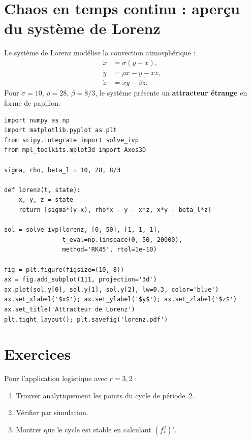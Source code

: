 \section{Chaos en temps continu : aper\c{c}u du syst\`eme de Lorenz}

\begin{definition}
Le syst\`eme de Lorenz mod\'elise la convection atmosph\'erique :
\begin{align}
  \dot{x} &= \sigma(y-x), \\
  \dot{y} &= \rho x - y - xz, \\
  \dot{z} &= xy - \beta z.
\end{align}
Pour $\sigma=10$, $\rho=28$, $\beta=8/3$, le syst\`eme pr\'esente un
\textbf{attracteur \'etrange} en forme de papillon.
\end{definition}

\begin{codeblock}[title=\textbf{Attracteur de Lorenz}]
\begin{verbatim}
import numpy as np
import matplotlib.pyplot as plt
from scipy.integrate import solve_ivp
from mpl_toolkits.mplot3d import Axes3D

sigma, rho, beta_l = 10, 28, 8/3

def lorenz(t, state):
    x, y, z = state
    return [sigma*(y-x), rho*x - y - x*z, x*y - beta_l*z]

sol = solve_ivp(lorenz, [0, 50], [1, 1, 1],
                t_eval=np.linspace(0, 50, 20000),
                method='RK45', rtol=1e-10)

fig = plt.figure(figsize=(10, 8))
ax = fig.add_subplot(111, projection='3d')
ax.plot(sol.y[0], sol.y[1], sol.y[2], lw=0.3, color='blue')
ax.set_xlabel('$x$'); ax.set_ylabel('$y$'); ax.set_zlabel('$z$')
ax.set_title('Attracteur de Lorenz')
plt.tight_layout(); plt.savefig('lorenz.pdf')
\end{verbatim}
\end{codeblock}

\section{Exercices}

\begin{exercice}
Pour l'application logistique avec $r=3{,}2$ :
\begin{enumerate}
  \item Trouver analytiquement les points du cycle de p\'eriode~2.
  \item V\'erifier par simulation.
  \item Montrer que le cycle est stable en calculant $(f_r^2)'$.
\end{enumerate}
\end{exercice}

